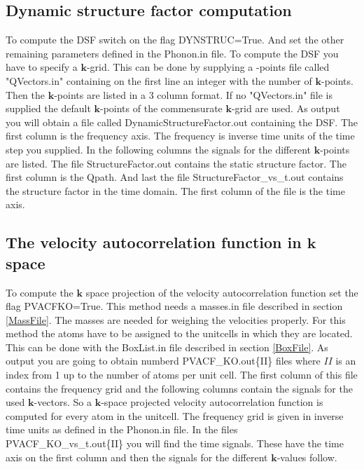 \documentclass[a4paper,12pt]{article}
\begin{document}
\subsection{Dynamic structure factor computation}
To compute the DSF switch on the flag DYNSTRUC=True. And set the other remaining parameters
defined in the Phonon.in file. To compute the DSF you have to specify a $\mathbf{k}$-grid.
This can be done by supplying a -points file called "QVectors.in" containing on the first line
an integer with the number of $\mathbf{k}$-points. Then the $\mathbf{k}$-points are listed in
a 3 column format. If no "QVectors.in" file is supplied the default $\mathbf{k}$-points
of the commensurate $\mathbf{k}$-grid are used. As output you will obtain a file called
DynamicStructureFactor.out containing the DSF. The first column is the frequency axis. 
The frequency is inverse time units of the time step you supplied.
In the following columns the signals for the different $\mathbf{k}$-points are listed.
The file StructureFactor.out contains the static structure factor. The first column is
the Qpath. And last the file StructureFactor\_vs\_t.out contains the structure factor in the
time domain. The first column of the file is the time axis.




\subsection{The velocity autocorrelation function in $\mathbf{k}$ space}
To compute the $\mathbf{k}$ space projection of the velocity autocorrelation function
set the flag PVACFKO=True. This method needs a masses.in file described
in section \ref{MassFile}. The masses are needed for weighing the velocities properly.
For this method the atoms have to be assigned to the unitcells
in which they are located. This can be done with the BoxList.in file described in
section \ref{BoxFile}. As output you are going to obtain numberd PVACF\_KO.out\{II\}
files where $II$ is an index from 1 up to the number of atoms per unit cell.
The first column of this file contains the frequency grid and the following columns
contain the signals for the used $\mathbf{k}$-vectors.
So a $\mathbf{k}$-space projected velocity autocorrelation function is computed for
every atom in the unitcell. The frequency grid is given in inverse time units as
defined in the Phonon.in file. In the files PVACF\_KO\_vs\_t.out\{II\} you will find
the time signals. These have the time axis on the first column and then
the signals for the different $\mathbf{k}$-values follow.
\end{document}
